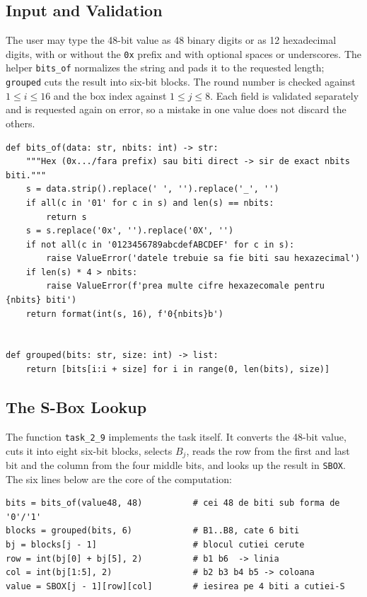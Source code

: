 \documentclass[12pt,a4paper]{article}
\begin{document}
\subsection{Input and Validation}

The user may type the 48-bit value as 48 binary digits or as 12 hexadecimal digits, with or without the \texttt{0x} prefix and with optional spaces or underscores. The helper \texttt{bits\_of} normalizes the string and pads it to the requested length; \texttt{grouped} cuts the result into six-bit blocks. The round number is checked against $1\le i\le 16$ and the box index against $1\le j\le 8$. Each field is validated separately and is requested again on error, so a mistake in one value does not discard the others.

\begin{lstlisting}[style=python,caption={Conversion of binary or hexadecimal input and grouping into six-bit blocks}]
def bits_of(data: str, nbits: int) -> str:
    """Hex (0x.../fara prefix) sau biti direct -> sir de exact nbits biti."""
    s = data.strip().replace(' ', '').replace('_', '')
    if all(c in '01' for c in s) and len(s) == nbits:
        return s
    s = s.replace('0x', '').replace('0X', '')
    if not all(c in '0123456789abcdefABCDEF' for c in s):
        raise ValueError('datele trebuie sa fie biti sau hexazecimal')
    if len(s) * 4 > nbits:
        raise ValueError(f'prea multe cifre hexazecomale pentru {nbits} biti')
    return format(int(s, 16), f'0{nbits}b')


def grouped(bits: str, size: int) -> list:
    return [bits[i:i + size] for i in range(0, len(bits), size)]
\end{lstlisting}

\newpage
\subsection{The S-Box Lookup}

The function \texttt{task\_2\_9} implements the task itself. It converts the 48-bit value, cuts it into eight six-bit blocks, selects $B_j$, reads the row from the first and last bit and the column from the four middle bits, and looks up the result in \texttt{SBOX}. The six lines below are the core of the computation:

\begin{lstlisting}[style=python,caption={S-box lookup for Task 2.9 (\texttt{des\_lab.py})}]
bits = bits_of(value48, 48)          # cei 48 de biti sub forma de '0'/'1'
blocks = grouped(bits, 6)            # B1..B8, cate 6 biti
bj = blocks[j - 1]                   # blocul cutiei cerute
row = int(bj[0] + bj[5], 2)          # b1 b6  -> linia
col = int(bj[1:5], 2)                # b2 b3 b4 b5 -> coloana
value = SBOX[j - 1][row][col]        # iesirea pe 4 biti a cutiei-S
\end{lstlisting}
\end{document}
